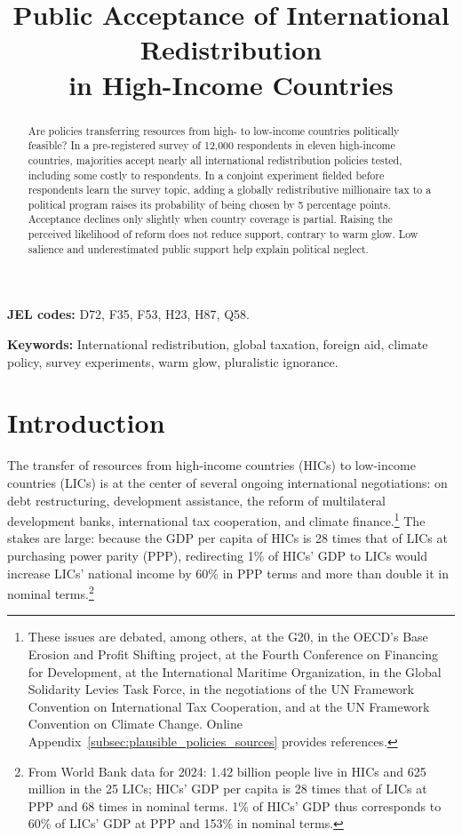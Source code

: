 \documentclass[12pt,english]{article}
\title{Public Acceptance of International Redistribution\\in High-Income Countries}
\author{}
\date{\vspace{-3em}}
\begin{document}
\maketitle

\begin{abstract}
\noindent Are policies transferring resources from high- to low-income countries politically feasible? In a pre-registered survey of 12,000 respondents in eleven high-income countries, majorities accept nearly all international redistribution policies tested, including some costly to respondents. In a conjoint experiment fielded before respondents learn the survey topic, adding a globally redistributive millionaire tax to a political program raises its probability of being chosen by 5 percentage points. Acceptance declines only slightly when country coverage is partial. Raising the perceived likelihood of reform does not reduce support, contrary to warm glow. Low salience and underestimated public support help explain political neglect.
\end{abstract}

\medskip
\noindent \textbf{JEL codes:} D72, F35, F53, H23, H87, Q58.

\noindent \textbf{Keywords:} International redistribution, global taxation, foreign aid, climate policy, survey experiments, warm glow, pluralistic ignorance.

\clearpage
\onehalfspacing

\section{Introduction}\label{sec:intro}

The transfer of resources from high-income countries (HICs) to low-income countries (LICs) is at the center of several ongoing international negotiations: on debt restructuring, development assistance, the reform of multilateral development banks, international tax cooperation, and climate finance.\footnote{These issues are debated, among others, at the G20, in the OECD's Base Erosion and Profit Shifting project, at the Fourth Conference on Financing for Development, at the International Maritime Organization, in the Global Solidarity Levies Task Force, in the negotiations of the UN Framework Convention on International Tax Cooperation, and at the UN Framework Convention on Climate Change. Online Appendix~\ref{subsec:plausible_policies_sources} provides references.} The stakes are large: because the GDP per capita of HICs is 28 times that of LICs at purchasing power parity (PPP), redirecting 1\% of HICs' GDP to LICs would increase LICs' national income by 60\% in PPP terms and more than double it in nominal terms.\footnote{From World Bank data for 2024: 1.42 billion people live in HICs and 625 million in the 25 LICs; HICs' GDP per capita is 28 times that of LICs at PPP and 68 times in nominal terms. 1\% of HICs' GDP thus corresponds to 60\% of LICs' GDP at PPP and 153\% in nominal terms.}
\end{document}
